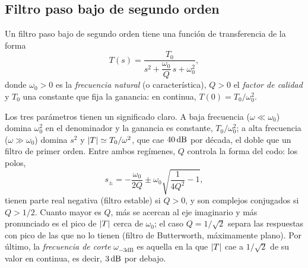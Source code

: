 \subsection{Filtro paso bajo de segundo orden}
\begin{definicion}
Un filtro paso bajo de segundo orden tiene una función de transferencia de la forma
\[
  T(s)=\frac{T_0}{s^{2}+\dfrac{\omega_0}{Q}\,s+\omega_0^{2}},
\]
donde $\omega_0>0$ es la \emph{frecuencia natural} (o característica), $Q>0$ el \emph{factor de calidad} y $T_0$
una constante que fija la ganancia: en continua, $T(0)=T_0/\omega_0^{2}$.
\end{definicion}

Los tres parámetros tienen un significado claro. A baja frecuencia ($\omega\ll\omega_0$) domina $\omega_0^{2}$ en el
denominador y la ganancia es constante, $T_0/\omega_0^{2}$; a alta frecuencia ($\omega\gg\omega_0$) domina $s^{2}$ y
$\lvert T\rvert\simeq T_0/\omega^{2}$, que cae $40\,\mathrm{dB}$ por década, el doble que un filtro de primer orden. Entre ambos
regímenes, $Q$ controla la forma del codo: los polos,
\[
  s_{\pm}=-\frac{\omega_0}{2Q}\pm\omega_0\sqrt{\frac{1}{4Q^{2}}-1},
\]
tienen parte real negativa (filtro estable) si $Q>0$, y son complejos conjugados si $Q>1/2$. Cuanto mayor es
$Q$, más se acercan al eje imaginario y más pronunciado es el pico de $\lvert T\rvert$ cerca de $\omega_0$; el caso
$Q=1/\sqrt2$ separa las respuestas con pico de las que no lo tienen (filtro de Butterworth, máximamente
plano). Por último, la \emph{frecuencia de corte} $\omega_{-3\mathrm{dB}}$ es aquella en la que $\lvert T\rvert$ cae a
$1/\sqrt2$ de su valor en continua, es decir, $3\,\mathrm{dB}$ por debajo.
